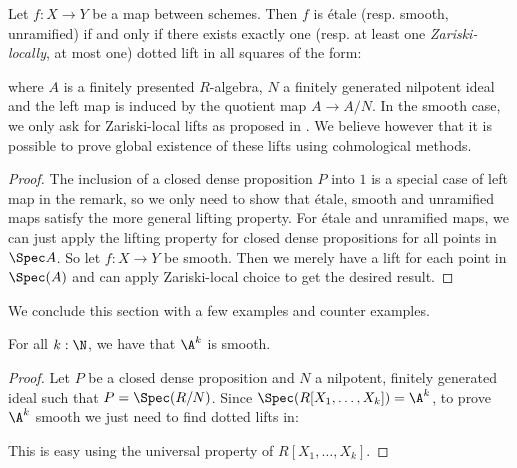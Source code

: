 \begin{remark}
  \label{connection-to-ega-definition}
  Let $f:X\to Y$ be a map between schemes.
  Then $f$ is étale (resp. smooth, unramified) if and only if there exists exactly one (resp. at least one \emph{Zariski-locally}, at most one) dotted lift in all squares of the form:
  \begin{center}
  \end{center}
where $A$ is a finitely presented $R$-algebra, $N$ a finitely generated nilpotent ideal and the left map is induced by the quotient map $A\to A/N$. In the smooth case, we only ask for Zariski-local lifts as proposed in \cite{insert stacks project reference here}. We believe however that it is possible to prove global existence of these lifts using cohmological methods.
\end{remark}

\begin{proof}
  The inclusion of a closed dense proposition $P$ into $1$ is a special case of left map in the remark, so we only need to show that étale,
  smooth and unramified maps satisfy the more general lifting property. For étale and unramified maps, we can just apply the lifting property for closed dense propositions for all points in $\Spec A$. So let $f:X\to Y$ be smooth. Then we merely have a lift for each point in $\Spec(A)$ and can apply Zariski-local choice to get the desired result.
\end{proof}

We conclude this section with a few examples and counter examples.

\begin{lemma}\label{An-is-smooth}
For all $k:\N$, we have that $\A^k$ is smooth.
\end{lemma}

\begin{proof}
  Let $P$ be a closed dense proposition and $N$ a nilpotent, finitely generated ideal such that $P=\Spec(R/N)$.
  Since $\Spec(R[X_1,\dots,X_k])=\A^k$, to prove $\A^k$ smooth we just need to find dotted lifts in:
  \begin{center}
  \end{center}
  This is easy using the universal property of $R[X_1,\dots,X_k]$.
\end{proof}

